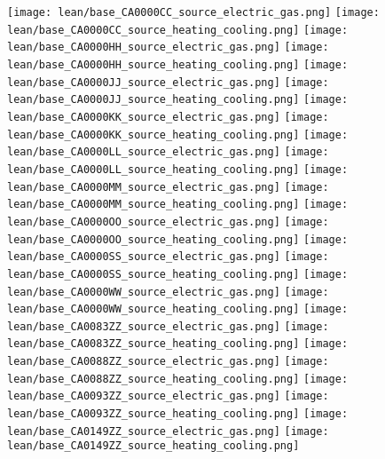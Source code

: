 \texttt{[image: lean/base\_CA0000CC\_source\_electric\_gas.png]}
\texttt{[image: lean/base\_CA0000CC\_source\_heating\_cooling.png]}
\texttt{[image: lean/base\_CA0000HH\_source\_electric\_gas.png]}
\texttt{[image: lean/base\_CA0000HH\_source\_heating\_cooling.png]}
\texttt{[image: lean/base\_CA0000JJ\_source\_electric\_gas.png]}
\texttt{[image: lean/base\_CA0000JJ\_source\_heating\_cooling.png]}
\texttt{[image: lean/base\_CA0000KK\_source\_electric\_gas.png]}
\texttt{[image: lean/base\_CA0000KK\_source\_heating\_cooling.png]}
\texttt{[image: lean/base\_CA0000LL\_source\_electric\_gas.png]}
\texttt{[image: lean/base\_CA0000LL\_source\_heating\_cooling.png]}
\texttt{[image: lean/base\_CA0000MM\_source\_electric\_gas.png]}
\texttt{[image: lean/base\_CA0000MM\_source\_heating\_cooling.png]}
\texttt{[image: lean/base\_CA0000OO\_source\_electric\_gas.png]}
\texttt{[image: lean/base\_CA0000OO\_source\_heating\_cooling.png]}
\texttt{[image: lean/base\_CA0000SS\_source\_electric\_gas.png]}
\texttt{[image: lean/base\_CA0000SS\_source\_heating\_cooling.png]}
\texttt{[image: lean/base\_CA0000WW\_source\_electric\_gas.png]}
\texttt{[image: lean/base\_CA0000WW\_source\_heating\_cooling.png]}
\texttt{[image: lean/base\_CA0083ZZ\_source\_electric\_gas.png]}
\texttt{[image: lean/base\_CA0083ZZ\_source\_heating\_cooling.png]}
\texttt{[image: lean/base\_CA0088ZZ\_source\_electric\_gas.png]}
\texttt{[image: lean/base\_CA0088ZZ\_source\_heating\_cooling.png]}
\texttt{[image: lean/base\_CA0093ZZ\_source\_electric\_gas.png]}
\texttt{[image: lean/base\_CA0093ZZ\_source\_heating\_cooling.png]}
\texttt{[image: lean/base\_CA0149ZZ\_source\_electric\_gas.png]}
\texttt{[image: lean/base\_CA0149ZZ\_source\_heating\_cooling.png]}
